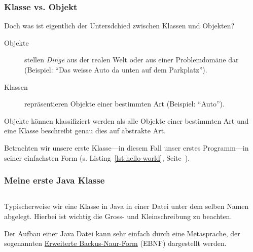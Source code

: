 \begin{frame}[fragile]
    \frametitle<presentation>{Klasse vs. Objekt}

    Doch was ist eigentlich der Untersdchied zwischen Klassen und Objekten?

    \begin{description}
        \item[Objekte] stellen \emph{Dinge} aus der realen Welt oder aus einer Problemdomäne
        dar (Beispiel: ``Das weisse Auto da unten auf dem Parkplatz'').
        \item[Klassen] repräsentieren Objekte einer bestimmten Art (Beispiel: ``Auto'').
    \end{description}

\end{frame}

Objekte können klassifiziert werden als alle Objekte einer bestimmten Art und
eine Klasse beschreibt genau dies auf abstrakte Art.

Betrachten wir unsere erste Klasse---in diesem Fall unser erstes Programm---in
seiner einfachsten Form (s. Listing~\ref{lst:hello-world}, Seite~\pageref{lst:hello-world}).

\begin{frame}[fragile]
    \frametitle<presentation>{Meine erste Java Klasse}

    \inputminted[frame=single,samepage]{java}{../java/academy/HelloWorld.java}

\end{frame}

\mode*
{}

Typischerweise wir eine Klasse in Java in einer Datei unter dem selben Namen abgelegt.
Hierbei ist wichtig die Gross- und Kleinschreibung zu beachten.



Der Aufbau einer Java Datei kann sehr einfach durch eine Metasprache, der sogenannten
\href{https://de.wikipedia.org/wiki/Erweiterte_Backus-Naur-Form}{Erweiterte Backus-Naur-Form}
(EBNF) dargestellt werden.

